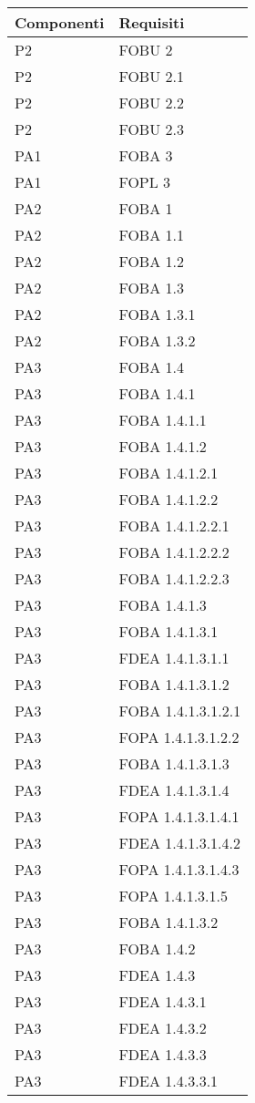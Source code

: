 \begin{longtable}{XX} 
\toprule 
\textbf{Componenti} & \textbf{Requisiti} \\
\toprule 
P2&FOBU 2\\ 
P2&FOBU 2.1\\ 
P2&FOBU 2.2\\ 
P2&FOBU 2.3\\ 
\midrule 
PA1&FOBA 3\\ 
PA1&FOPL 3\\ 
\midrule 
PA2&FOBA 1\\ 
PA2&FOBA 1.1\\ 
PA2&FOBA 1.2\\ 
PA2&FOBA 1.3\\ 
PA2&FOBA 1.3.1\\ 
PA2&FOBA 1.3.2\\ 
\midrule 
PA3&FOBA 1.4\\ 
PA3&FOBA 1.4.1\\ 
PA3&FOBA 1.4.1.1\\ 
PA3&FOBA 1.4.1.2\\ 
PA3&FOBA 1.4.1.2.1\\ 
PA3&FOBA 1.4.1.2.2\\ 
PA3&FOBA 1.4.1.2.2.1\\ 
PA3&FOBA 1.4.1.2.2.2\\ 
PA3&FOBA 1.4.1.2.2.3\\ 
PA3&FOBA 1.4.1.3\\ 
PA3&FOBA 1.4.1.3.1\\ 
PA3&FDEA 1.4.1.3.1.1\\ 
PA3&FOBA 1.4.1.3.1.2\\ 
PA3&FOBA 1.4.1.3.1.2.1\\ 
PA3&FOPA 1.4.1.3.1.2.2\\ 
PA3&FOBA 1.4.1.3.1.3\\ 
PA3&FDEA 1.4.1.3.1.4\\ 
PA3&FOPA 1.4.1.3.1.4.1\\ 
PA3&FDEA 1.4.1.3.1.4.2\\ 
PA3&FOPA 1.4.1.3.1.4.3\\ 
PA3&FOPA 1.4.1.3.1.5\\ 
PA3&FOBA 1.4.1.3.2\\ 
PA3&FOBA 1.4.2\\ 
PA3&FDEA 1.4.3\\ 
PA3&FDEA 1.4.3.1\\ 
PA3&FDEA 1.4.3.2\\ 
PA3&FDEA 1.4.3.3\\ 
PA3&FDEA 1.4.3.3.1\\ 

\end{longtable}
